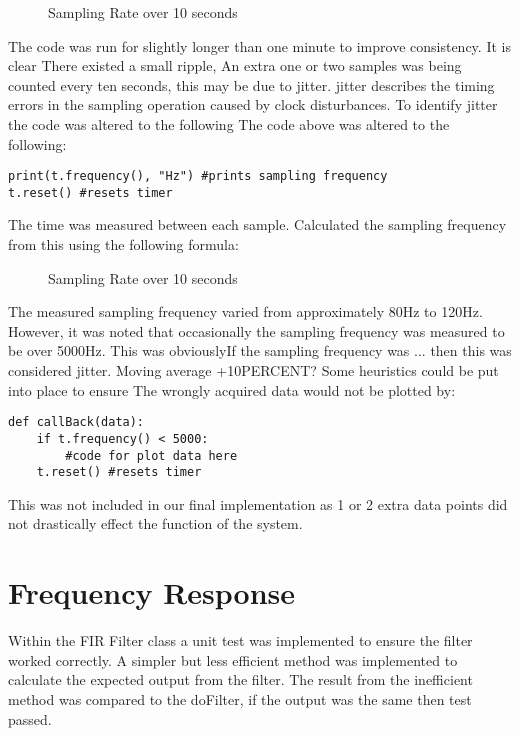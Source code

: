\documentclass{article}
\begin{document}
\begin{figure}[h!]
    \centering
    
    \caption{Sampling Rate over 10 seconds}
    \label{fig:universe}
\end{figure}
\newline 
The code was run for slightly longer than one minute to improve consistency. It is clear There existed a small ripple, An extra one or two samples was being counted every ten seconds, this may be due to jitter. jitter describes the timing errors in the sampling operation caused by clock disturbances. To identify jitter the code was altered to the following The code above was altered to the following:\\
\lstset{language=Python}
\begin{lstlisting}
print(t.frequency(), "Hz") #prints sampling frequency
t.reset() #resets timer
\end{lstlisting}
The time was measured between each sample. Calculated the sampling frequency from this using the following formula:
\newline
\begin{figure}[h!]
    \centering
    
    \caption{Sampling Rate over 10 seconds}
    \label{fig:universe}
\end{figure}
\newline 
The measured sampling frequency varied from approximately 80Hz to 120Hz. However, it was noted that occasionally the sampling frequency was measured to be over 5000Hz. This was obviouslyIf the sampling frequency was ... then this was considered jitter. Moving average +10PERCENT? Some heuristics could be put into place to ensure The wrongly acquired data would not be plotted by:
\lstset{language=Python}
\begin{lstlisting}
def callBack(data):
    if t.frequency() < 5000:
        #code for plot data here
    t.reset() #resets timer
\end{lstlisting}
This was not included in our final implementation as 1 or 2 extra data points did not drastically effect the function of the system.


\section{Frequency Response}
Within the FIR Filter class a unit test was implemented to ensure the filter worked correctly. A simpler but less efficient method was implemented to calculate the expected output from the filter. The result from the inefficient method was compared to the doFilter, if the output was the same then test passed.
\end{document}
